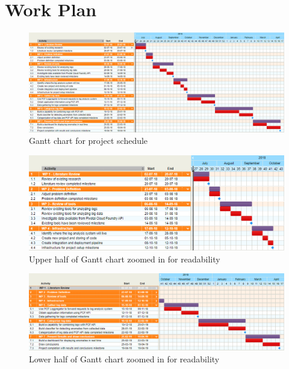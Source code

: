 \chapter{Work Plan}

\begin{figure}[ht]
  \centering
  \includegraphics[width=1.0\textwidth]{./figures/gantt.png}
  \caption{Gantt chart for project schedule}
  \label{fig:gantt}
\end{figure}

\begin{figure}[ht]
  \centering
  \includegraphics[width=1.0\textwidth]{./figures/gantt-small-top.png}
  \caption{Upper half of Gantt chart zoomed in for readability}
  \label{fig:gantt}
\end{figure}

\clearpage

\begin{figure}[ht]
  \centering
  \includegraphics[width=1.0\textwidth]{./figures/gantt-small-bottom.png}
  \caption{Lower half of Gantt chart zoomed in for readability}
  \label{fig:gantt}
\end{figure}

